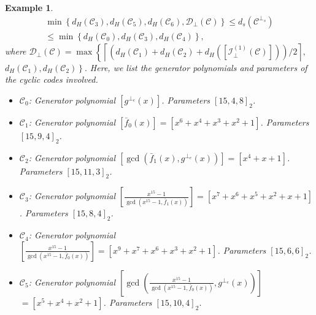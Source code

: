 \documentclass[journal]{IEEEtran}
\newtheorem{example}{Example}
\begin{document}
\begin{example}
 	\begin{equation} \label{improve_boundD}
 			\begin{array}{rl}
 	\min\left\{ d_H(\mathscr{C}_3),d_H(\mathscr{C}_5), d_H(\mathscr{C}_6), \mathcal{D}_{\perp}(\mathscr{C})\right\}  \le d_s(\mathscr{C}^{\perp_s})\\
 	 \le 
 	\min\left\{d_H(\mathscr{C}_0),d_H(\mathscr{C}_3),d_H(\mathscr{C}_4)\right\},
 \end{array}
 \end{equation}
where 
 $
 	\mathcal{D}_{\perp}(\mathscr{C})=\max \left\{ \left\lceil\left(d_H(\mathscr{C}_1)+d_H(\mathscr{C}_2)+ d_H\left(\left[ \mathcal{I}^{(1)}_{\perp}(\mathscr{C}) \right]\right)\right)/ 2\right\rceil\right.
 	,$ $\left.  d_H(\mathscr{C}_1),d_H(\mathscr{C}_2)\right\}.
$
Here, we list the generator polynomials and parameters of the cyclic codes involved.
 \begin{itemize}
      \item  $\mathscr{C}_0$: Generator polynomial $\left[g^{\perp_{e}}(x)\right]$. 
      Parameters $\left[15,4,8\right]_2$.
      \item  $\mathscr{C}_1$: Generator polynomial $\left[\bar{f}_0(x)\right]=\left[x^6 + x^4 + x^3 + x^2 + 1\right]$. Parameters $\left[15,9,4\right]_2$.
      \item  $\mathscr{C}_2$: Generator polynomial $\left[\gcd(\bar{f}_1(x),g^{\perp_{e}}(x))\right]=\left[x^4 + x + 1\right]$. Parameters $\left[15,11,3\right]_2$.
     \item $\mathscr{C}_3$: Generator polynomial $\left[\frac{x^{15}-1}{\gcd( x^{15}-1,\bar{f}_1(x))}\right]=\left[x^7 + x^6 + x^5 + x^2 + x + 1\right]$. Parameters $\left[15,8,4\right]_2$.
      \item $\mathscr{C}_4$: Generator polynomial $\left[\frac{x^{15}-1}{\gcd( x^{15}-1,\bar{f}_0(x))}\right]=\left[x^9 + x^7 + x^6 + x^3 + x^2 + 1\right]$. Parameters $\left[15,6,6\right]_2$.
      \item  $\mathscr{C}_5$: Generator polynomial $\left[\gcd\left( \frac{x^{15}-1}{\gcd( x^{15}-1,\bar{f}_0(x))},g^{\perp_{e}}(x) \right)\right]$ $=\left[x^5 + x^4 + x^2 + 1\right]$. Parameters $\left[15,10,4\right]_2$.

\end{itemize}
\end{example}
\end{document}
